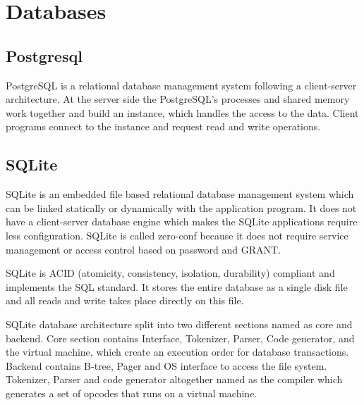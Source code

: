 \section{Databases}
\label{sec:db}

\subsection{Postgresql}
PostgreSQL is a relational database management system following a client-server architecture. At the server side the PostgreSQL's processes and shared memory work together and build an instance, which handles the access to the data. Client programs connect to the instance and request read and write operations.

\subsection{SQLite}


SQLite is an embedded file based relational database management system which can be linked statically or dynamically with the application program. It does not have a client-server database engine which makes the SQLite applications require less configuration. SQLite is called zero-conf because it does not require service management or access control based on password and GRANT.


SQLite is ACID  (atomicity, consistency, isolation, durability) compliant and implements the SQL standard. It stores the entire database as a single disk file and all reads and write takes place directly on this file. 

SQLite database architecture split into two different sections named as core and backend. Core section contains Interface, Tokenizer, Parser, Code generator, and the virtual machine, which create an execution order for database transactions. Backend contains B-tree, Pager and OS interface to access the file system. Tokenizer, Parser and code generator altogether named as the compiler which generates a set of opcodes that runs on a virtual machine.

